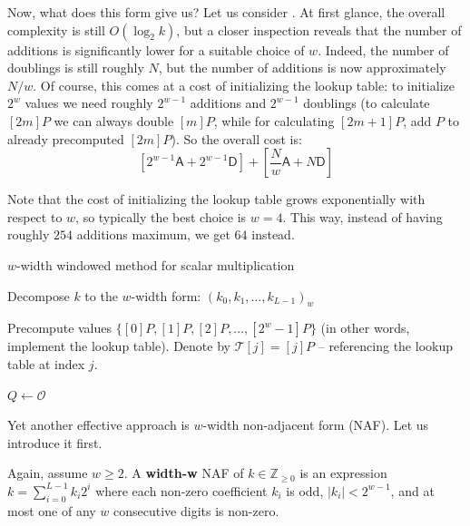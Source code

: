 \documentclass{iacrtrans}
\begin{document}
Now, what does this form give us? Let us consider . At first glance, the overall complexity is still $O(\log_2k)$, but a closer inspection reveals that the number of additions is significantly lower for a suitable choice of $w$. Indeed, the number of doublings is still roughly $N$, but the number of additions is now approximately $N/w$. Of course, this comes at a cost of initializing the lookup table: to initialize $2^w$ values we need roughly $2^{w-1}$ additions and $2^{w-1}$ doublings (to calculate $[2m]P$ we can always double $[m]P$, while for calculating $[2m+1]P$, add $P$ to already precomputed $[2m]P$). So the overall cost is:
\begin{equation}
    \left[2^{w-1}\mathsf{A} + 2^{w-1}\mathsf{D}\right] + \left[\frac{N}{w}\mathsf{A} + N\mathsf{D}\right]
\end{equation}

Note that the cost of initializing the lookup table grows exponentially with respect to $w$, so typically the best choice is $w=4$. This way, instead of having roughly $254$ additions maximum, we get $64$ instead.

\begin{algorithm}
\caption{$w$-width windowed method for scalar multiplication}\label{alg:windowed}

Decompose $k$ to the $w$-width form: $(k_0,k_1,\dots,k_{L-1})_w$

Precompute values $\{[0]P,[1]P,[2]P,\dots,[2^w-1]P\}$ (in other words, implement the lookup table). Denote by $\mathcal{T}[j] = [j]P$ -- referencing the lookup table at index $j$.

$Q \gets \mathcal{O}$


\end{algorithm}

Yet another effective approach is $w$-width non-adjacent form (NAF). Let us introduce it first.

\begin{definition}
    Again, assume $w \geq 2$. A \textbf{width-w} NAF of $k \in \mathbb{Z}_{\geq 0}$ is an expression $k=\sum_{i=0}^{L-1}k_i2^i$ where each non-zero coefficient $k_i$ is odd, $|k_i| < 2^{w-1}$, and at most one of any $w$ consecutive digits is non-zero.
\end{definition}
\end{document}
